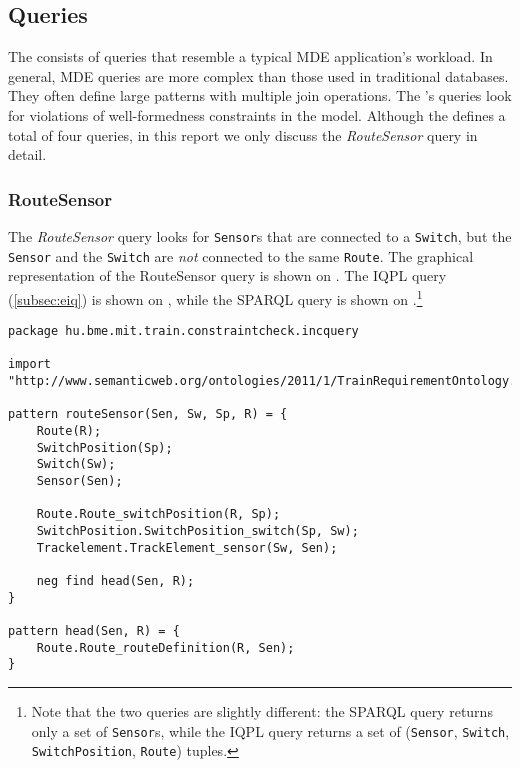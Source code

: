 \subsection{Queries}

The \tb{} consists of queries that resemble a typical MDE application's workload. In general, MDE queries are more complex than those used in traditional databases. They often define large patterns with multiple join operations. The \tb{}'s queries look for violations of well-formedness constraints in the model. Although the \tb{} defines a total of four queries, in this report we only discuss the \textit{RouteSensor} query in detail.

\subsubsection{RouteSensor}


The \textit{RouteSensor} query looks for \texttt{Sensor}s that are connected to a \texttt{Switch}, but the \texttt{Sensor} and the \texttt{Switch} are \emph{not} connected to the same \texttt{Route}. The graphical representation of the RouteSensor query is shown on . The IQPL query (\autoref{subsec:eiq}) is shown on , while the SPARQL query is shown on .\footnote{Note that the two queries are slightly different: the SPARQL query returns only a set of \texttt{Sensor}s, while the IQPL query returns a set of (\texttt{Sensor}, \texttt{Switch}, \texttt{SwitchPosition}, \texttt{Route}) tuples.} %

\lstset{language=viatra}

\begin{lstlisting}[caption=The RouteSensor query in IQPL, label=lst:routesensor-iqpl]
package hu.bme.mit.train.constraintcheck.incquery

import "http://www.semanticweb.org/ontologies/2011/1/TrainRequirementOntology.owl" 

pattern routeSensor(Sen, Sw, Sp, R) = {
	Route(R);
	SwitchPosition(Sp);
	Switch(Sw);
	Sensor(Sen);
	
	Route.Route_switchPosition(R, Sp);
	SwitchPosition.SwitchPosition_switch(Sp, Sw);
	Trackelement.TrackElement_sensor(Sw, Sen);
	
	neg find head(Sen, R);	
}

pattern head(Sen, R) = {
	Route.Route_routeDefinition(R, Sen);
}
\end{lstlisting}


